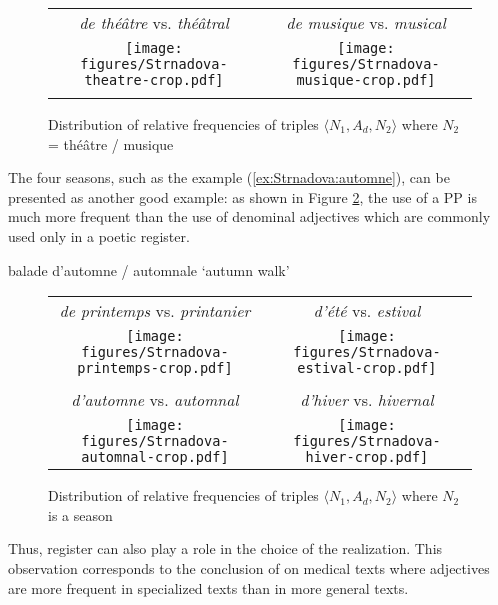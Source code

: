 \documentclass[output=paper]{LSP/langsci}
\begin{document}
\begin{figure}
\centering\small
\begin{tabular}{cc}
\emph{de théâtre} vs. \emph{théâtral} 
&
\emph{de musique} vs. \emph{musical}\\
\texttt{[image: figures/Strnadova-theatre-crop.pdf]}
&
\texttt{[image: figures/Strnadova-musique-crop.pdf]}\\ \\
\end{tabular}
\caption{ Distribution of relative frequencies of triples $\langle N_1,A_d,N_2\rangle$ where $N_2$  =  théâtre / musique}
\label{fig:Strnadova:theatral-musical}
\end{figure}

The four seasons, such as the example (\ref{ex:Strnadova:automne}), can be presented as another good example: as shown in Figure \ref{fig:Strnadova:Saisons}, the use of a PP is much more frequent than the use of denominal adjectives which are commonly used  only in a poetic register.

\begin{exe}
\ex \label{ex:Strnadova:automne} {balade d'automne / automnale} `autumn walk'
\end{exe}

\begin{figure}
\centering
\small
\begin{tabular}{cc}
\emph{de printemps} vs. \emph{printanier} 
&
\emph{d'été} vs. \emph{estival}\\
\texttt{[image: figures/Strnadova-printemps-crop.pdf]}
&
\texttt{[image: figures/Strnadova-estival-crop.pdf]}\\ \\
\emph{d'automne} vs. \emph{automnal} 
&
\emph{d'hiver} vs. \emph{hivernal}\\
\texttt{[image: figures/Strnadova-automnal-crop.pdf]}
&
\texttt{[image: figures/Strnadova-hiver-crop.pdf]}
\end{tabular}
\caption{ Distribution of relative frequencies of triples $\langle N_1,A_d,N_2\rangle$ where $N_2$ is a season}
\label{fig:Strnadova:Saisons}
\end{figure}

Thus, register can also play a role in the choice of the realization. This observation corresponds to the conclusion of \citet{cartonideleger2010} on medical texts where adjectives are more frequent in specialized texts than in more general texts.
\end{document}
